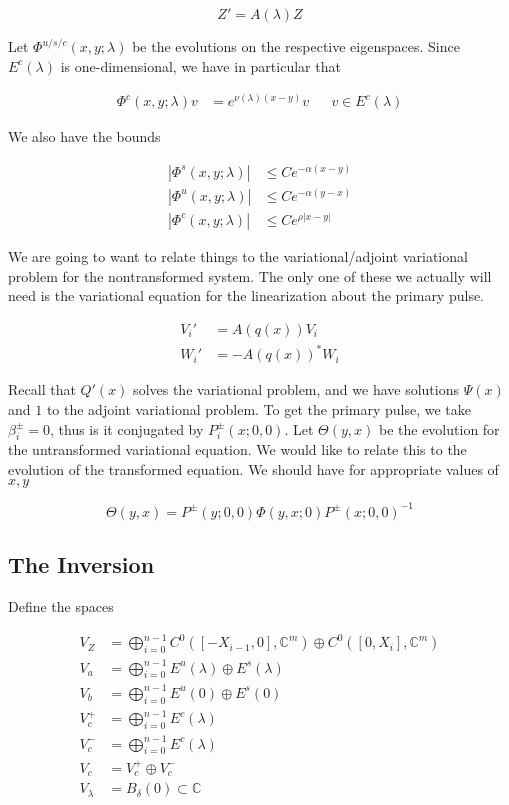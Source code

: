 \documentclass[12pt]{article}
\def\C{{\mathbb C}}
\begin{document}
\[
Z' = A(\lambda) Z
\]

Let $\Phi^{u/s/c}(x, y; \lambda)$ be the evolutions on the respective eigenspaces. Since $E^c(\lambda)$ is one-dimensional, we have in particular that

\begin{align*}
\Phi^c(x, y; \lambda) v &= e^{\nu(\lambda)(x - y)} v && v \in E^c(\lambda)
\end{align*}

We also have the bounds

\begin{align*}
|\Phi^s(x, y; \lambda)| &\leq C e^{-\alpha(x - y)} \\
|\Phi^u(x, y; \lambda)| &\leq C e^{-\alpha(y - x)} \\
|\Phi^c(x, y; \lambda)| &\leq C e^{\rho|x - y|} 
\end{align*}

We are going to want to relate things to the variational/adjoint variational problem for the nontransformed system. The only one of these we actually will need is the variational equation for the linearization about the primary pulse.

\begin{align*}
V_i' &= A(q(x)) V_i \\
W_i' &= -A(q(x))^* W_i
\end{align*}

Recall that $Q'(x)$ solves the variational problem, and we have solutions $\Psi(x)$ and $1$ to the adjoint variational problem. To get the primary pulse, we take $\beta_i^\pm = 0$, thus is it conjugated by $P_i^\pm(x; 0, 0)$. Let $\Theta(y, x)$ be the evolution for the untransformed variational equation. We would like to relate this to the evolution of the transformed equation. We should have for appropriate values of $x, y$

\[
\Theta(y, x) = P^\pm(y; 0, 0) \Phi(y, x; 0) P^\pm(x; 0, 0)^{-1}
\]

\subsection*{The Inversion}

Define the spaces

\begin{align*}
V_Z &= \bigoplus_{i=0}^{n-1} C^0([-X_{i-1}, 0], \C^m) \oplus C^0([0, X_i], \C^m) \\
V_a &= \bigoplus_{i=0}^{n-1} E^u(\lambda) \oplus E^s(\lambda) \\
V_b &= \bigoplus_{i=0}^{n-1} E^u(0) \oplus E^s(0) \\
V_c^+ &= \bigoplus_{i=0}^{n-1} E^c(\lambda) \\
V_c^- &= \bigoplus_{i=0}^{n-1} E^c(\lambda) \\
V_c &= V_c^+ \oplus V_c^- \\
V_\lambda &= B_\delta(0) \subset \C
\end{align*}
\end{document}
